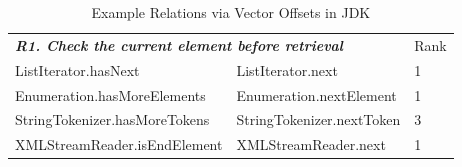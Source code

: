 \begin{wraptable}{l}{9.8cm}
	\vspace{-10pt}
  \centering
  \small
  \tabcolsep 1pt
  \caption{Example Relations via Vector Offsets in JDK}
    \begin{tabular}{lll}
    \toprule
    \multicolumn{2}{l}{{\bf {\em R1. Check the current element before retrieval}}}  & Rank\\
    ListIterator.hasNext & ListIterator.next & 1 \\
    Enumeration.hasMoreElements & Enumeration.nextElement & 1 \\
    StringTokenizer.hasMoreTokens & StringTokenizer.nextToken & 3 \\
    XMLStreamReader.isEndElement & XMLStreamReader.next & 1 \\
    \midrule

\end{tabular}
\end{wraptable}
